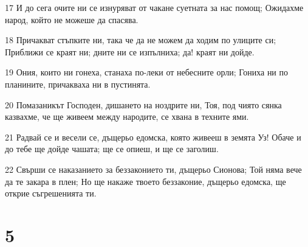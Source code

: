 \par 17 И до сега очите ни се изнуряват от чакане суетната за нас помощ; Ожидахме народ, който не можеше да спасява.
\par 18 Причакват стъпките ни, така че да не можем да ходим по улиците си; Приближи се краят ни; дните ни се изпълниха; да! краят ни дойде.
\par 19 Ония, които ни гонеха, станаха по-леки от небесните орли; Гониха ни по планините, причакваха ни в пустинята.
\par 20 Помазаникът Господен, дишането на ноздрите ни, Тоя, под чиято сянка казвахме, че ще живеем между народите, се хвана в техните ями.
\par 21 Радвай се и весели се, дъщерьо едомска, която живееш в земята Уз! Обаче и до тебе ще дойде чашата; ще се опиеш, и ще се заголиш.
\par 22 Свърши се наказанието за беззаконието ти, дъщерьо Сионова; Той няма вече да те закара в плен; Но ще накаже твоето беззаконие, дъщерьо едомска, ще открие съгрешенията ти.

\chapter{5}

